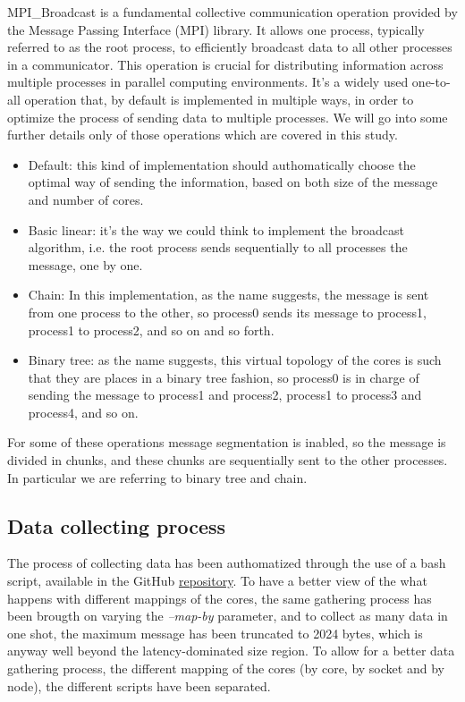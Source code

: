 \documentclass{article}
\begin{document}
	MPI\_Broadcast is a fundamental collective communication operation provided by the Message Passing Interface (MPI) library. It allows one process, typically referred to as the root process, to efficiently broadcast data to all other processes in a communicator. This operation is crucial for distributing information across multiple processes in parallel computing environments. It's a widely used one-to-all operation that, by default is implemented in multiple ways, in order to optimize the process of sending data to multiple processes.
	We will go into some further details only of those operations which are covered in this study.
	\begin{itemize}
		\item Default: this kind of implementation should authomatically choose the optimal way of sending the information, based on both size of the message and number of cores.\\
		\item Basic linear: it's the way we could think to implement the broadcast algorithm, i.e. the root process sends sequentially to all processes the message, one by one.\\
		\item Chain: In this implementation, as the name suggests, the message is sent from one process to the other, so process0 sends its message to process1, process1 to process2, and so on and so forth.\\
		\item Binary tree: as the name suggests, this virtual topology of the cores is such that they are places in a binary tree fashion, so process0 is in charge of sending the message to process1 and process2, process1 to process3 and process4, and so on.
	\end{itemize}
	
	
	For some of these operations message segmentation is inabled, so the message is divided in chunks, and these chunks are sequentially sent to the other processes. In particular we are referring to binary tree and chain.
	
	\subsection{Data collecting process}
	The process of collecting data has been authomatized through the use of a bash script, available in the GitHub \href{https://github.com/ValentinisAlessio/HPC_final_project}{repository}. 
	To have a better view of the what happens with different mappings of the cores, the same gathering process has been brougth on varying the \textit{--map-by} parameter, and to collect as many data in one shot, the maximum message has been truncated to 2024 bytes, which is anyway well beyond the latency-dominated size region.
	To allow for a better data gathering process, the different mapping of the cores (by core, by socket and by node), the different scripts have been separated.
	
\end{document}
